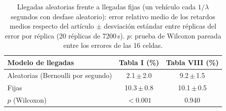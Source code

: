 \begin{table}[!t]
\caption{Llegadas aleatorias frente a llegadas fijas (un vehículo cada $1/\lambda$ segundos con desfase aleatorio): error relativo medio de los retardos medios respecto del artículo $\pm$ desviación estándar entre réplicas del error por réplica (20 réplicas de 7200\,s). $p$: prueba de Wilcoxon pareada entre los errores de las 16 celdas.}
\label{tab:llegadas}
\centering
\footnotesize
\begin{tabular}{@{}lcc@{}}
\toprule
Modelo de llegadas & Tabla I (\%) & Tabla VIII (\%) \\
\midrule
Aleatorias (Bernoulli por segundo) & 2.1\,$\pm$\,2.0 & 9.2\,$\pm$\,1.5 \\
Fijas & 10.3\,$\pm$\,0.8 & 10.1\,$\pm$\,0.5 \\
$p$ (Wilcoxon) & $<0.001$ & 0.940 \\
\bottomrule
\end{tabular}
\end{table}
